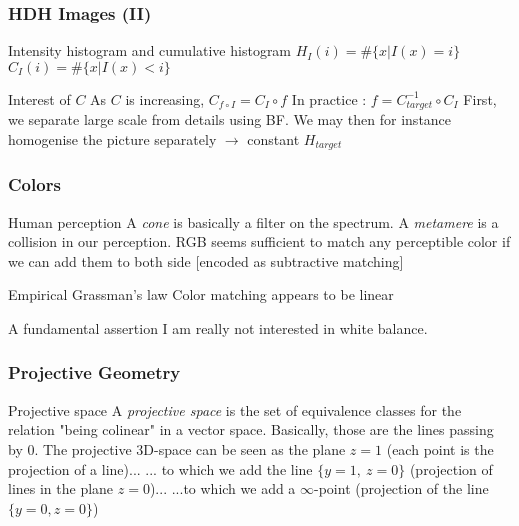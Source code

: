 \documentclass[pdf]{beamer}
\begin{document}
\begin{frame}
\frametitle{HDH Images (II)}

\begin{block}{Intensity histogram and cumulative histogram}
$H_I(i) = \# \{x \vert I(x) = i \}$ \newline
$C_I(i) = \# \{x \vert I(x) < i \}$ \newline
\end{block}

\begin{exampleblock}{Interest of $C$}
As $C$ is increasing, $C_{f \circ I} = C_I \circ f$ \newline
In practice : $f = C^{-1}_{target} \circ C_I$ \newline
First, we separate large scale from details using BF.\newline
We may then for instance homogenise the picture separately \newline
 $\rightarrow$ constant $H_{target}$ \newline
\end{exampleblock}

\end{frame}

\begin{frame}
\frametitle{Colors}

\begin{block}{Human perception}
A \emph{cone} is basically a filter on the spectrum.\newline
A \emph{metamere} is a collision in our perception.\newline
RGB seems sufficient to match any perceptible color if we can add them to both side [encoded as subtractive matching]
\end{block}

\begin{alertblock}{Empirical Grassman's law}
Color matching appears to be linear
\end{alertblock}

\begin{alertblock}{A fundamental assertion}
I am really not interested in white balance.
\end{alertblock}

\end{frame}

\begin{frame}
\frametitle{Projective Geometry}

\begin{block}{Projective space}
A \emph{projective space} is the set of equivalence classes for the relation "being colinear" in a vector space.\newline
Basically, those are the lines passing by 0. \newline
The projective 3D-space can be seen as the plane $z=1$ (each point is the projection of a line)...\newline
... to which we add the line $\{y=1,~z=0\}$ (projection of lines in the plane $z=0$)... \newline
...to which we add a $\infty$-point (projection of the line $\{y=0,z=0\}$) \newline
\end{block}

\end{frame}
\end{document}
